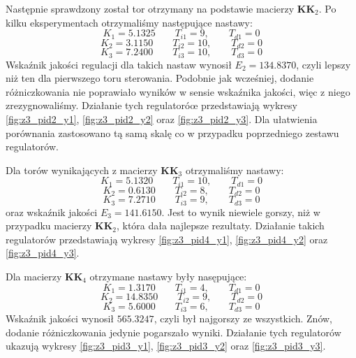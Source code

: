 Następnie sprawdzony został tor otrzymany na podstawie macierzy $\bm{KK}_2$.
Po kilku eksperymentach otrzymaliśmy następujące nastawy:
\begin{equation}
  K_1 = \num{5.1325} \qquad T_{i1} = 9, \qquad T_{d1} = 0 \nonumber
\end{equation}
\begin{equation}
  K_2 = \num{3.1150} \qquad T_{i2} = 10, \qquad T_{d2} = 0
\end{equation}
\begin{equation}
  K_3 = \num{7.2400} \qquad T_{i3} = 10, \qquad T_{d3} = 0 \nonumber
\end{equation}
Wskaźnik jakości regulacji dla takich nastaw wynosił $E_2 = \num{134.8370}$, czyli
lepszy niż ten dla pierwszego
toru sterowania. Podobnie jak wcześniej, dodanie różniczkowania nie poprawiało
wyników w sensie wskaźnika jakości, więc z niego zrezygnowaliśmy. Działanie
tych regulatoróœ przedstawiają wykresy \ref{fig:z3_pid2_y1},
\ref{fig:z3_pid2_y2} oraz \ref{fig:z3_pid2_y3}. Dla ułatwienia porównania zastosowano
tą samą skalę co w przypadku poprzedniego zestawu regulatorów. 

Dla torów wynikających z macierzy $\bm{KK}_3$ otrzymaliśmy nastawy:
\begin{equation}
  K_1 = \num{5.1320} \qquad T_{i1} = 10, \qquad T_{d1} = 0 \nonumber
\end{equation}
\begin{equation}
  K_2 = \num{0.6130} \qquad T_{i2} = 8, \qquad T_{d2} = 0
\end{equation}
\begin{equation}
  K_3 = \num{7.2710} \qquad T_{i3} = 9, \qquad T_{d3} = 0 \nonumber
\end{equation}
oraz wskaźnik jakości $E_3 = \num{141.6150}$. Jest to wynik niewiele gorszy, niż
w przypadku macierzy $\bm{KK}_2$, która dała najlepsze rezultaty.
Działanie takich regulatorów przedstawiają wykresy \ref{fig:z3_pid4_y1},
\ref{fig:z3_pid4_y2} oraz \ref{fig:z3_pid4_y3}.

Dla macierzy $\bm{KK}_4$ otrzymane nastawy
były nasępujące:
\begin{equation}
  K_1 = \num{1.3170} \qquad T_{i1} = 4, \qquad T_{d1} = 0 \nonumber
\end{equation}
\begin{equation}
  K_2 = \num{14.8350} \qquad T_{i2} = 9, \qquad T_{d2} = 0
\end{equation}
\begin{equation}
  K_3 = \num{5.6000} \qquad T_{i3} = 6, \qquad T_{d3} = 0 \nonumber
\end{equation}
Wskaźnik jakości wynosił $\num{565.3247}$, czyli był najgorszy ze wszystkich.
Znów, dodanie różniczkowania jedynie pogarszało wyniki. Działanie tych
regulatorów ukazują wykresy \ref{fig:z3_pid3_y1},
\ref{fig:z3_pid3_y2} oraz \ref{fig:z3_pid3_y3}.

